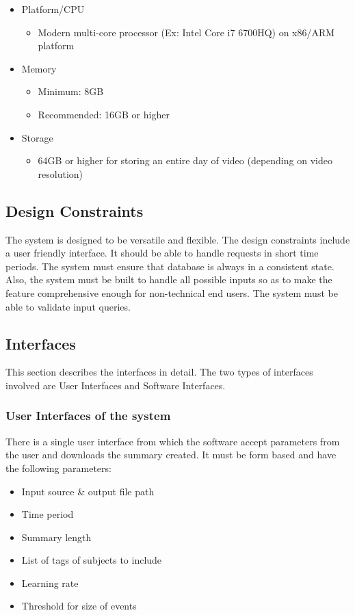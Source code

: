     \begin{itemize}
        \item Platform/CPU
        \begin{itemize}
            \item Modern multi-core processor (Ex: Intel Core i7 6700HQ) on
            x86/ARM platform
        \end{itemize}
        \item Memory
        \begin{itemize}
            \item Minimum: 8GB
            \item Recommended: 16GB or higher
        \end{itemize}
        \item Storage
        \begin{itemize}
            \item 64GB or higher for storing an entire day of video (depending
            on video resolution)
        \end{itemize}
    \end{itemize}

    \subsection{Design Constraints}
    The system is designed to be versatile and flexible. The design constraints
    include a user friendly interface. It should be able to handle requests in
    short time periods. The system must ensure that database is always in a
    consistent state. Also, the system must be built to handle all possible
    inputs so as to make the feature comprehensive enough for non-technical
    end users. The system must be able to validate input queries.

    \subsection{Interfaces}
    This section describes the interfaces in detail. The two types of
    interfaces involved are User Interfaces and Software Interfaces.
        \subsubsection{User Interfaces of the system}
        There is a single user interface from which the software accept
        parameters from the user and downloads the summary created. It must be
        form based and have the following parameters:
        \begin{itemize}
            \item Input source \& output file path
            \item Time period
            \item Summary length
            \item List of tags of subjects to include
            \item Learning rate
            \item Threshold for size of events
        \end{itemize}

